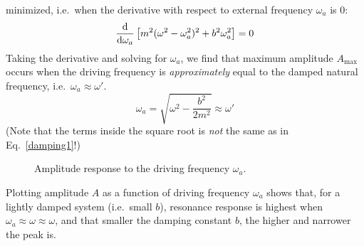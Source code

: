 minimized, i.e.\ when the derivative with respect to external frequency
$\omega_a$ is 0:
\begin{equation}
  \diff{}{\omega_a}\left[m^2(\omega^2-\omega_a^2)^2+b^2\omega_a^2\right]=0
\end{equation}
Taking the derivative and solving for $\omega_a$, we find that maximum
amplitude $A_\text{max}$ occurs when the driving frequency is
\emph{approximately} equal to the damped natural frequency, i.e.\
$\omega_a\approx\omega'$.
\begin{equation}
  \omega_a=\sqrt{\omega^2-\frac{b^2}{2m^2}}\approx\omega'
\end{equation}
(Note that the terms inside the square root is \emph{not} the same as in
Eq.~\ref{damping1}!) %

\begin{figure}[ht]
  \centering
  \caption{Amplitude response to the driving frequency $\omega_a$.}
  \label{fig:amp-response}
\end{figure}
Plotting amplitude $A$ as a function of driving frequency $\omega_a$ shows
that, for a lightly damped system (i.e.\ small $b$), resonance response is
highest when $\omega_a\approx\omega\approx\omega$, and that smaller the
damping constant $b$, the higher and narrower the peak is.


